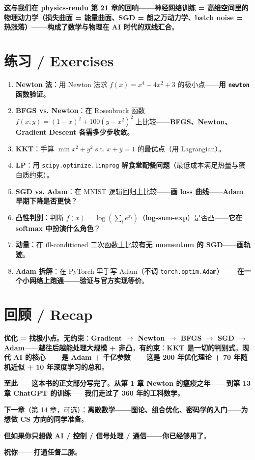 \textbf{这与我们在 \textbf{physics-rendu 第 21 章}的回响——\textbf{神经网络训练 = 高维空间里的\textbf{物理动力学}}（损失曲面 = 能量曲面、SGD = 朗之万动力学、batch noise = 热涨落）——构成了\textbf{数学与物理在 AI 时代的双线汇合}}。

\section{练习 / Exercises}

\begin{enumerate}
\item \textbf{Newton 法}：用 Newton 法求 $f(x) = x^4 - 4x^2 + 3$ 的极小点——\textbf{用 \texttt{newton} 函数验证}。
\item \textbf{BFGS vs. Newton}：在 Rosenbrock 函数 $f(x,y) = (1-x)^2 + 100(y-x^2)^2$ 上比较——\textbf{BFGS、Newton、Gradient Descent 各需多少步收敛}。
\item \textbf{KKT}：手算 $\min x^2 + y^2$ s.t. $x + y = 1$ 的最优点（用 Lagrangian）。
\item \textbf{LP}：用 \texttt{scipy.optimize.linprog} 解\textbf{食堂配餐问题}（最低成本满足热量与蛋白质约束）。
\item \textbf{SGD vs. Adam}：在 MNIST 逻辑回归上比较——\textbf{画 loss 曲线}——\textbf{Adam 早期下降是否更快}？
\item \textbf{凸性判别}：判断 $f(x) = \log(\sum_i e^{x_i})$（\textbf{log-sum-exp}）是否凸——\textbf{它在 softmax 中扮演什么角色}？
\item \textbf{动量}：在 ill-conditioned 二次函数上比较\textbf{有无 momentum 的 SGD}——\textbf{画轨迹}。
\item \textbf{Adam 拆解}：在 PyTorch 里手写 Adam（不调 \texttt{torch.optim.Adam}）——\textbf{在一个小网络上跑通——验证与官方实现等价}。
\end{enumerate}

\section{回顾 / Recap}

\begin{tcolorbox}[essbox={本章一句话总结}]
\textbf{优化 = 找极小点}。\textbf{无约束}：\textbf{Gradient $\to$ Newton $\to$ BFGS $\to$ SGD $\to$ Adam}——\textbf{越往后越能处理大规模 + 非凸}。\textbf{有约束}：\textbf{KKT 是一切的判别式}。\textbf{现代 AI 的核心——是 \textbf{Adam + 千亿参数}——这是 200 年优化理论 + 70 年随机近似 + 10 年深度学习的总和}。
\end{tcolorbox}

\textbf{至此}——\textbf{这本书的正文部分写完了}。\textbf{从第 1 章 Newton 的瘟疫之年——到第 13 章 ChatGPT 的训练}——\textbf{我们走过了 360 年的工科数学}。

\textbf{下一章}（第 14 章，可选）：\textbf{离散数学——图论、组合优化、密码学的入门}——\textbf{为想做 CS 方向的同学准备}。

\textbf{但如果你只想做 AI / 控制 / 信号处理 / 通信——\textbf{你已经够用了}}。

\textbf{祝你——\textbf{打通任督二脉}}。

\clearpage

